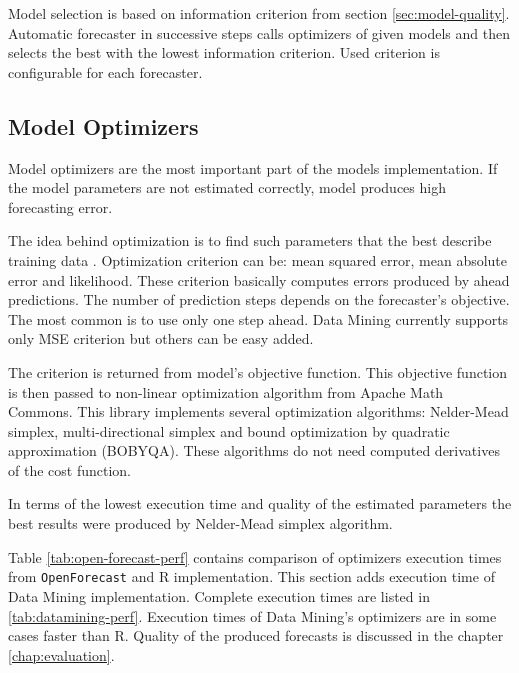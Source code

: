         Model selection is based on information criterion from section \ref{sec:model-quality}. Automatic forecaster in
        successive steps calls optimizers of given models and then selects the best with the lowest information
        criterion. Used criterion is configurable for each forecaster.

        \subsection{Model Optimizers}
        Model optimizers are the most important part of the models implementation. If the model parameters are not
        estimated correctly, model produces high forecasting error.

        The idea behind optimization is to find such
        parameters that the best describe training data \cite{hyndman-state-space}. Optimization criterion can be: mean
        squared error, mean absolute error and likelihood. These criterion basically computes errors produced by ahead
        predictions. The number of prediction steps depends on the forecaster's objective. The most common is to use
        only one step ahead. Data Mining currently supports only MSE criterion but others can be easy added.

        The criterion is returned from model's objective function. This objective function is then passed to non-linear
        optimization algorithm from Apache Math Commons. This library implements several optimization algorithms:
        Nelder-Mead simplex, multi-directional simplex and bound optimization by quadratic approximation (BOBYQA).
        These algorithms do not need computed derivatives of the cost function.

        In terms of the lowest execution time and quality of the estimated parameters the best results were produced by
        Nelder-Mead simplex algorithm.

        Table \ref{tab:open-forecast-perf} contains comparison of optimizers execution times from \texttt{OpenForecast}
        and R implementation. This section adds execution time of Data Mining implementation. Complete execution times are
        listed in \ref{tab:datamining-perf}. Execution times of Data Mining's optimizers are in some cases faster than R.
        Quality of the produced forecasts is discussed in the chapter \ref{chap:evaluation}.

